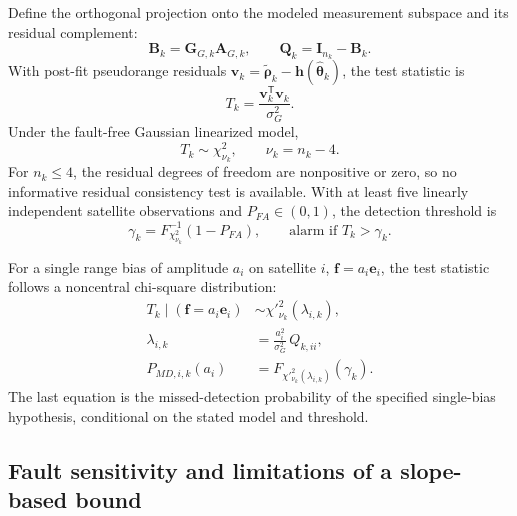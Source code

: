 \documentclass[pdflatex,sn-mathphys-num]{sn-jnl}
\newcommand{\vect}[1]{\boldsymbol{#1}}
\newcommand{\mat}[1]{\mathbf{#1}}
\newcommand{\trans}{^{\mathsf T}}
\begin{document}
Define the orthogonal projection onto the modeled measurement subspace
and its residual complement:
\begin{equation}\label{eq:gnss-BQ}
 \mat{B}_k=\mat{G}_{G,k}\mat{A}_{G,k},\qquad
 \mat{Q}_k=\mat{I}_{n_k}-\mat{B}_k.
\end{equation}
With post-fit pseudorange residuals
$\vect{v}_k=\tilde{\vect{\rho}}_k-
\vect{h}(\hat{\vect{\theta}}_k)$,
the test statistic is
\begin{equation}\label{eq:raim-stat}
 T_k=\frac{\vect{v}_k\trans\vect{v}_k}{\sigma_G^2}.
\end{equation}
Under the fault-free Gaussian linearized model,
\begin{equation}\label{eq:raim-null}
 T_k\sim\chi^2_{\nu_k},\qquad \nu_k=n_k-4.
\end{equation}
For $n_k\leq4$, the residual degrees of freedom are nonpositive or zero,
so no informative residual consistency test is available. With at least
five linearly independent satellite observations and
$P_{FA}\in(0,1)$, the detection threshold is
\begin{equation}\label{eq:raim-thresh}
 \gamma_k=F^{-1}_{\chi^2_{\nu_k}}(1-P_{FA}),
 \qquad \text{alarm if }T_k>\gamma_k.
\end{equation}

For a single range bias of amplitude $a_i$ on satellite $i$,
$\vect{f}=a_i\vect{e}_i$, the test statistic follows a noncentral
chi-square distribution:
\begin{align}
 T_k\mid(\vect{f}=a_i\vect{e}_i)
 &\sim\chi'^2_{\nu_k}(\lambda_{i,k}),\label{eq:raim-alt}\\
 \lambda_{i,k}&=\frac{a_i^2}{\sigma_G^2}\,Q_{k,ii},
 \label{eq:raim-lambda}\\
 P_{MD,i,k}(a_i)&=F_{\chi'^2_{\nu_k}(\lambda_{i,k})}
 (\gamma_k).\label{eq:raim-pmd}
\end{align}
The last equation is the missed-detection probability of the specified
single-bias hypothesis, conditional on the stated model and threshold.

\subsection{Fault sensitivity and limitations of a slope-based bound}
\end{document}
